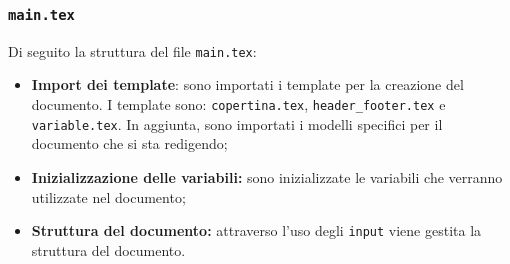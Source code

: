 \subsubsection{\texttt{main.tex}}
Di seguito la struttura del file \texttt{main.tex}:
\begin{itemize}
	\item \textbf{Import dei template}: sono importati i template per la
	      creazione del documento. I template sono: \texttt{copertina.tex},
	      \texttt{header\_footer.tex} e \texttt{variable.tex}. In aggiunta, sono
	      importati i modelli specifici per il documento che si sta redigendo;

	\item \textbf{Inizializzazione delle variabili:} sono inizializzate le
	      variabili che verranno utilizzate nel documento;

	\item \textbf{Struttura del documento:} attraverso l'uso degli
	      \texttt{input} viene gestita la struttura del documento.
\end{itemize}

